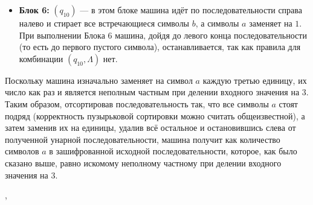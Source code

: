 \documentclass[a4paper,12pt]{article}
\newcommand {\gu} [1] {\guillemotleft#1\guillemotright}
\begin{document}
\begin{itemize}
        \item \textbf{Блок 6:} {\boldmath $(q_{10})$} --- в этом блоке машина идёт по последовательности справа налево и стирает все встречающиеся символы \gu{$b$}, а символы \gu{$a$} заменяет на \gu{$1$}. При выполнении Блока 6 машина, дойдя до левого конца последовательности (то есть до первого пустого символа), останавливается, так как правила для комбинации $(q_{10}, \Lambda)$ нет.
    \end{itemize}
    
    Поскольку машина изначально заменяет на символ \gu{$a$} каждую третью единицу, их число как раз и является неполным частным при делении входного значения на 3. Таким образом, отсортировав последовательность так, что все символы \gu{$a$} стоят подряд (корректность пузырьковой сортировки можно считать общеизвестной), а затем заменив их на единицы, удалив всё остальное и остановившись слева от полученной унарной последовательности, машина получит как количество символов \gu{$a$} в зашифрованной исходной последовательности, которое, как было сказано выше, равно искомому неполному частному при делении входного значения на 3.
    
    \sep
    
    
\end{document}

